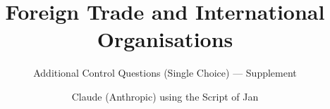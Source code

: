 
\documentclass[paper=a5]{scrartcl}
\usepackage{xcolor}
\usepackage{hsbcommon}
\usepackage[hidelinks]{hyperref}
\usepackage[utf8]{inputenc}
\usepackage{setspace}
\usepackage{pgfplots}
\pgfplotsset{compat=1.18}
\usepackage{hsbquestions}
\showanswerstrue                 %

\title{Foreign Trade and International Organisations}
\subtitle{Additional Control Questions (Single Choice) — Supplement}
\author{Claude (Anthropic) using the Script of Jan }


\onehalfspacing
\maketitle
\clearpage

